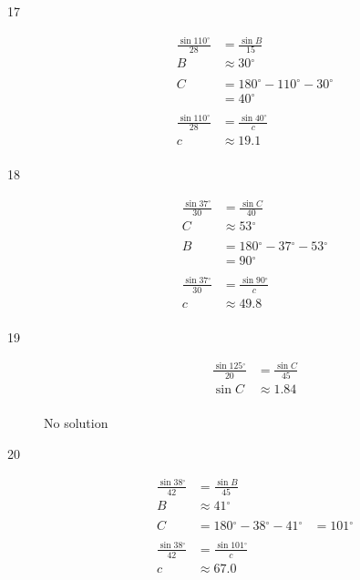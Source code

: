 \documentclass{exam}
\newcommand{\dg}{\ensuremath{^\circ}}
\begin{document}
\begin{description}
      \item[17] 
        \begin{align*}
          \frac{\sin 110 \dg}{28} & = \frac{\sin B}{15} \\
          B                       & \approx \boxed{ 30 \dg } \\
          \\
          C & = 180 \dg - 110 \dg - 30 \dg \\
            & = \boxed{ 40 \dg } \\
          \\
          \frac{\sin 110 \dg}{28} & = \frac{\sin 40 \dg}{c} \\
          c                       & \approx \boxed{ 19.1 } \\
        \end{align*}

      \item[18] 
        \begin{align*}
          \frac{\sin 37 \dg}{30} & = \frac{\sin C}{40} \\
          C                      & \approx \boxed{ 53 \dg } \\
          \\
          B & = 180 \dg - 37 \dg - 53 \dg \\
            & = \boxed{ 90 \dg } \\
          \\
          \frac{\sin 37 \dg}{30} & = \frac{\sin 90 \dg}{c} \\
          c                      & \approx \boxed{ 49.8 } \\
        \end{align*}

      \item[19] 
        \begin{align*}
          \frac{\sin 125 \dg}{20} & = \frac{\sin C}{45} \\
          \sin C                  & \approx 1.84 \\
        \end{align*}

        No solution

      \item[20] 
        \begin{align*}
          \frac{\sin 38 \dg}{42} & = \frac{\sin B}{45} \\
          B                      & \approx \boxed{ 41 \dg } \\
          \\
          C & = 180 \dg - 38 \dg - 41 \dg 
            & = \boxed{ 101 \dg } \\
          \\
          \frac{\sin 38 \dg}{42} & = \frac{\sin 101 \dg}{c} \\
          c                      & \approx \boxed{ 67.0 } \\
        \end{align*}


\end{description}
\end{document}
